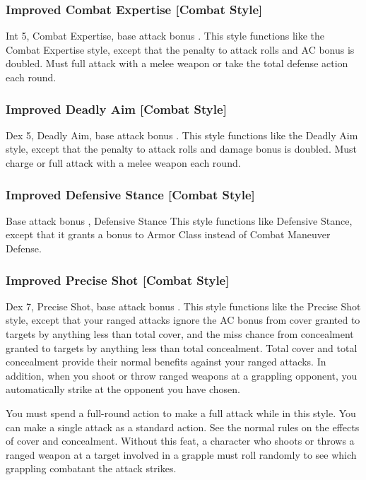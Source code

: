 \subsubsection{Improved Combat Expertise [Combat Style]}
 Int 5, Combat Expertise, base attack bonus .
 This style functions like the Combat Expertise style, except that the penalty to attack rolls and AC bonus is doubled.
 Must full attack with a melee weapon or take the total defense action each round.

\subsubsection{Improved Deadly Aim [Combat Style]}
 Dex 5, Deadly Aim, base attack bonus .
 This style functions like the Deadly Aim style, except that the penalty to attack rolls and damage bonus is doubled.
 Must charge or full attack with a melee weapon each round.

\subsubsection{Improved Defensive Stance [Combat Style]}
 Base attack bonus , Defensive Stance
 This style functions like Defensive Stance, except that it grants a bonus to Armor Class instead of Combat Maneuver Defense.

\subsubsection{Improved Precise Shot [Combat Style]}
 Dex 7, Precise Shot, base attack bonus .
 This style functions like the Precise Shot style, except that your ranged attacks ignore the AC bonus from cover granted to targets by anything less than total cover, and the miss chance from concealment granted to targets by anything less than total concealment. Total cover and total concealment provide their normal benefits against your ranged attacks. In addition, when you shoot or throw ranged weapons at a grappling opponent, you automatically strike at the opponent you have chosen.

You must spend a full-round action to make a full attack while in this style. You can make a single attack as a standard action.
 See the normal rules on the effects of cover and concealment. Without this feat, a character who shoots or throws a ranged weapon at a target involved in a grapple must roll randomly to see which grappling combatant the attack strikes.%


